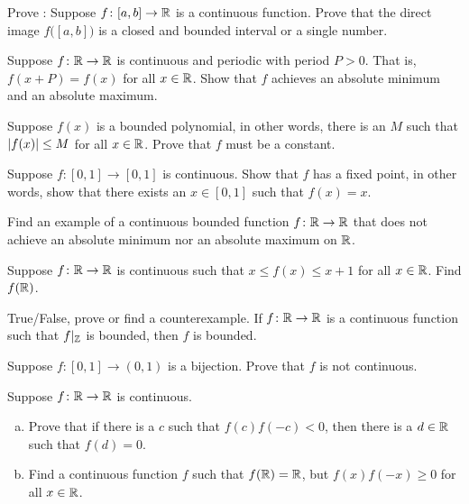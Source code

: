 \begin{exercise}
Prove :
Suppose $f \colon [a,b] \to {\mathbb{R}}$ is a continuous function.  Prove
that the direct image $f\bigl([a,b]\bigr)$ is a closed and bounded interval or
a single number.
\end{exercise}

\begin{exercise}
Suppose $f \colon {\mathbb{R}} \to {\mathbb{R}}$ is continuous and periodic with period
$P > 0$.  That is, $f(x+P) = f(x)$ for all $x \in {\mathbb{R}}$.  Show that $f$
achieves an absolute minimum and an absolute maximum.
\end{exercise}

\begin{exercise}[Challenging]
Suppose $f(x)$ is a bounded polynomial,
in other words, there is an $M$ such that $\left\lvert {f(x)} \right\rvert \leq M$
for all $x \in {\mathbb{R}}$.  Prove that $f$ must be a constant.
\end{exercise}

\begin{exercise}
Suppose $f \colon [0,1] \to [0,1]$ is continuous.  Show that $f$
has a fixed point, in other words, show that there exists an $x \in [0,1]$ such that
$f(x) = x$.
\end{exercise}

\begin{exercise}
Find an example of a continuous bounded function $f \colon {\mathbb{R}} \to {\mathbb{R}}$ that does
not achieve an absolute minimum nor an absolute maximum on ${\mathbb{R}}$.
\end{exercise}

\begin{exercise}
Suppose $f \colon {\mathbb{R}} \to {\mathbb{R}}$ is continuous such that
$x \leq f(x) \leq x+1$ for all $x \in {\mathbb{R}}$.  Find $f({\mathbb{R}})$.
\end{exercise}

\begin{exercise}
True/False, prove or find a counterexample.  If $f \colon {\mathbb{R}} \to
{\mathbb{R}}$ is a continuous function such that $f|_{{\mathbb{Z}}}$ is bounded, then $f$
is bounded.
\end{exercise}

\begin{exercise}
Suppose $f \colon [0,1] \to (0,1)$ is a bijection.  Prove that $f$ is not
continuous.
\end{exercise}

\begin{exercise}
Suppose $f \colon {\mathbb{R}} \to {\mathbb{R}}$ is continuous.
\begin{enumerate}[a)]
\item
Prove that if there is a $c$ such that $f(c)f(-c) < 0$,
then there is a $d \in {\mathbb{R}}$ such that $f(d) = 0$.
\item
Find a continuous function $f$ such that
$f({\mathbb{R}}) = {\mathbb{R}}$, but $f(x)f(-x) \geq 0$ for all $x \in {\mathbb{R}}$.
\end{enumerate}
\end{exercise}

